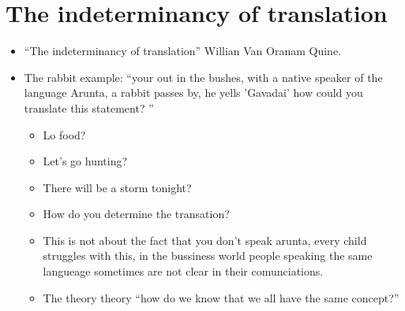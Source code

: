 \section{The indeterminancy of translation}
\begin{itemize}
    \item ``The indeterminancy of translation'' Willian Van Oranam Quine.
    \item The rabbit example: ``your out in the bushes, with a native speaker of the language Arunta, a rabbit passes by, he yells 'Gavadai' how could you translate this statement? ''
        \begin{itemize}
            \item Lo food? 
            \item Let's go hunting? 
            \item There will be a storm tonight? 
            \item How do you determine the transation?
            \item This is not about the fact that you don't speak arunta, every child struggles with this, in the bussiness world people speaking the same langueage sometimes are not clear in their comunciations. 
            \item The theory theory ``how do we know that we all have the same concept?''
        \end{itemize}
\end{itemize}



